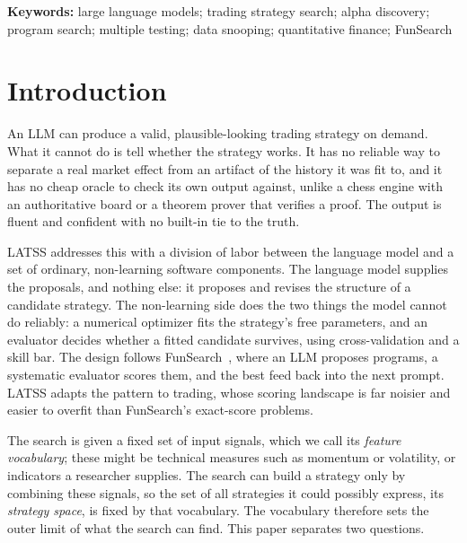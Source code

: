 \documentclass[11pt]{article}
\begin{document}
\noindent\textbf{Keywords:} large language models; trading strategy search; alpha discovery; program search; multiple testing; data snooping; quantitative finance; FunSearch

\clearpage
\tableofcontents

\section{Introduction}

An LLM can produce a valid, plausible-looking trading strategy on demand. What it cannot do is tell
whether the strategy works. It has no reliable way to separate a real market effect from an artifact
of the history it was fit to, and it has no cheap oracle to check its own output against, unlike a
chess engine with an authoritative board or a theorem prover that verifies a proof. The output is
fluent and confident with no built-in tie to the truth.

LATSS addresses this with a division of labor between the language model and a set of ordinary,
non-learning software components. The language model supplies the proposals, and nothing else: it
proposes and revises the structure of a candidate strategy. The non-learning side does the two things
the model cannot do reliably: a numerical optimizer fits the strategy's free parameters, and an
evaluator decides whether a fitted candidate survives, using cross-validation and a skill bar. The design follows
FunSearch~\cite{funsearch}, where an LLM proposes programs, a systematic evaluator scores them, and
the best feed back into the next prompt. LATSS adapts the pattern to trading, whose scoring landscape
is far noisier and easier to overfit than FunSearch's exact-score problems.

The search is given a fixed set of input signals, which we call its \emph{feature vocabulary}; these
might be technical measures such as momentum or volatility, or indicators a researcher supplies. The
search can build a strategy only by combining these signals, so the set of all strategies it could
possibly express, its \emph{strategy space}, is fixed by that vocabulary. The vocabulary therefore sets
the outer limit of what the search can find. This paper separates two questions.
\end{document}
